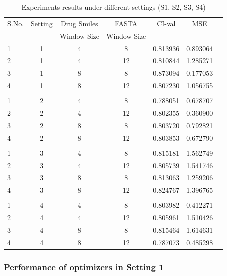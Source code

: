 \begin{table}[tbp]
    \centering
    \caption{Experiments results under different settings (S1, S2, S3, S4)}
    \begin{tabular}{|l|c|c|c|c|c|c|}
    \hline 
    
     S.No. & Setting & Drug Smiles & FASTA &  CI-val & MSE  \\ 
       &   & Window Size &  Window Size    & &    \\  \toprule \hline
     1 & 1 & 4 & 8 & 0.813936 & 0.893064 \\ \hline
     2 & 1 & 4 & 12 & 0.810844 & 1.285271 \\ \hline
     3 & 1 & 8 & 8 & 0.873094 & 0.177053 \\ \hline
     4 & 1 & 8 & 12 & 0.807230 & 1.056755 \\ \hline
     \\ \hline
     1 & 2 & 4 & 8 & 0.788051 & 0.678707 \\ \hline
     2 & 2 & 4 & 12 & 0.802355 & 0.360900 \\ \hline
     3 & 2 & 8 & 8 & 0.803720 & 0.792821 \\ \hline
     4 & 2 & 8 & 12 & 0.803853 & 0.672790 \\ \hline
     \\ \hline
     1 & 3 & 4 & 8 & 0.815181 & 1.562749 \\ \hline
     2 & 3 & 4 & 12 & 0.805739 & 1.541746 \\ \hline
     3 & 3 & 8 & 8 & 0.813063 & 1.259206 \\ \hline
     4 & 3 & 8 & 12 & 0.824767 & 1.396765 \\ \hline
     \\ \hline
     1 & 4 & 4 & 8 & 0.803982 & 0.412271 \\ \hline
     2 & 4 & 4 & 12 & 0.805961 & 1.510426 \\ \hline
     3 & 4 & 8 & 8 & 0.815464 & 1.614631 \\ \hline
     4 & 4 & 8 & 12 & 0.787073 & 0.485298 \\ \hline
     
    
    
    \end{tabular}
    \label{table:results}
\end{table}

\subsubsection{Performance of optimizers in Setting 1}

